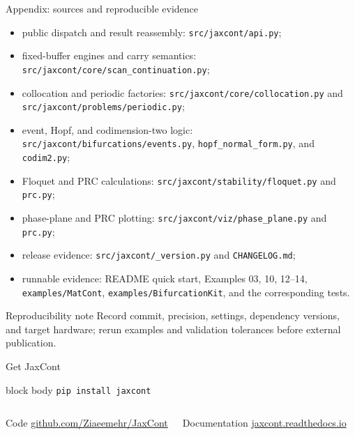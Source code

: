 \begin{frame}{Appendix: sources and reproducible evidence}
\scriptsize
\begin{itemize}
  \item public dispatch and result reassembly: \texttt{src/jaxcont/api.py};
  \item fixed-buffer engines and carry semantics: \texttt{src/jaxcont/core/scan\_continuation.py};
  \item collocation and periodic factories: \texttt{src/jaxcont/core/collocation.py} and
        \texttt{src/jaxcont/problems/periodic.py};
  \item event, Hopf, and codimension-two logic: \texttt{src/jaxcont/bifurcations/events.py},
        \texttt{hopf\_normal\_form.py}, and \texttt{codim2.py};
  \item Floquet and PRC calculations: \texttt{src/jaxcont/stability/floquet.py} and \texttt{prc.py};
  \item phase-plane and PRC plotting: \texttt{src/jaxcont/viz/phase\_plane.py} and \texttt{prc.py};
  \item release evidence: \texttt{src/jaxcont/\_version.py} and \texttt{CHANGELOG.md};
  \item runnable evidence: README quick start, Examples 03, 10, 12--14,
        \texttt{examples/MatCont}, \texttt{examples/BifurcationKit}, and the corresponding tests.
\end{itemize}

\begin{block}{Reproducibility note}
Record commit, precision, settings, dependency versions, and target hardware;
rerun examples and validation tolerances before external publication.
\end{block}
\end{frame}

\begin{frame}{Get JaxCont}
\centering
\vspace{4mm}
\begin{beamercolorbox}[sep=8pt,center,rounded=true]{block body}
\Large\texttt{pip install jaxcont}
\end{beamercolorbox}

\vspace{8mm}
\begin{columns}[T,onlytextwidth]
\begin{block}{Code}
\centering\small
\href{https://github.com/Ziaeemehr/JaxCont}{github.com/Ziaeemehr/JaxCont}
\end{block}
\begin{block}{Documentation}
\centering\small
\href{https://jaxcont.readthedocs.io/en/latest/index.html}{jaxcont.readthedocs.io}
\end{block}
\end{columns}
\end{frame}
